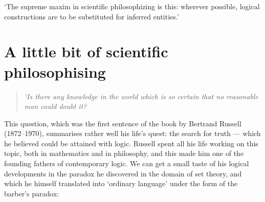 \begin{savequote}[8cm]

	‘The supreme maxim in scientific philosophizing is this: wherever possible, logical constructions are to be substituted for inferred entities.’
	
	
\end{savequote}

\chapter{\label{ch:10-philosophising}A little bit of scientific philosophising}


\minitoc{}






\begin{quote}
	\textit{‘Is there any knowledge in the world which is so certain that no reasonable man could doubt it?}
\end{quote}

This question, which was the first sentence of the book \textit{} \citeyearpar{russell1912problems} by Bertrand Russell (1872--1970), summarises rather well his life's quest: the search for truth — which he believed could be attained with logic.
Russell spent all his life working on this topic, both in mathematics and in philosophy, and this made him one of the founding fathers of contemporary logic.
We can get a small taste of his logical developments in the paradox he discovered in the domain of set theory, and which he himself translated into ‘ordinary language’ \citep{russell1918philosophy} under the form of the barber's paradox:

